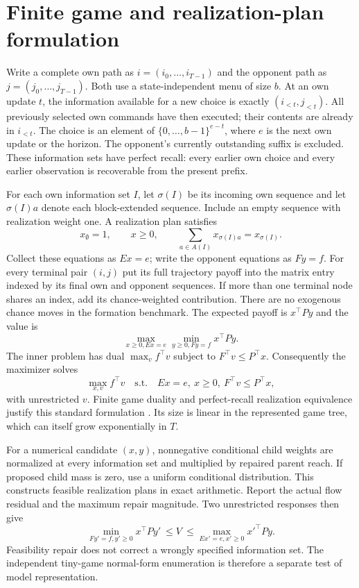 \section{Finite game and realization-plan formulation}
Write a complete own path as $i=(i_0,\ldots,i_{T-1})$ and the opponent path
as $j=(j_0,\ldots,j_{T-1})$. Both use a state-independent menu of size $b$.
At an own update $t$, the information available for a new choice is exactly
$(i_{<t},j_{<t})$. All previously selected own commands have then executed;
their contents are already in $i_{<t}$. The choice is an element of
$\{0,\ldots,b-1\}^{e-t}$, where $e$ is the next own update or the horizon.
The opponent's currently outstanding suffix is excluded. These information
sets have perfect recall: every earlier own choice and every earlier
observation is recoverable from the present prefix.

For each own information set $I$, let $\sigma(I)$ be its incoming own
sequence and let $\sigma(I)a$ denote each block-extended sequence. Include
an empty sequence with realization weight one. A realization plan satisfies
\[
 x_{\emptyset}=1,\qquad x\ge0,\qquad
 \sum_{a\in A(I)}x_{\sigma(I)a}=x_{\sigma(I)}.
\]
Collect these equations as $Ex=e$; write the opponent equations as $Fy=f$.
For every terminal pair $(i,j)$ put its full trajectory payoff into the
matrix entry indexed by its final own and opponent sequences. If more than
one terminal node shares an index, add its chance-weighted contribution.
There are no exogenous chance moves in the formation benchmark. The expected
payoff is $x^\top Py$ and the value is
\[
 \max_{x\ge0,Ex=e}\min_{y\ge0,Fy=f}x^\top Py.
\]
The inner problem has dual $\max_v f^\top v$ subject to $F^\top v\le P^\top x$.
Consequently the maximizer solves
\begin{equation}
 \max_{x,v}f^\top v\quad\text{s.t.}\quad
 Ex=e,\ x\ge0,\ F^\top v\le P^\top x,
 \label{eq:sf}
\end{equation}
with unrestricted $v$. Finite game duality and perfect-recall realization
equivalence justify this standard formulation \citep{stengel1996}.
Its size is linear in the represented game tree, which can itself grow
exponentially in $T$.

For a numerical candidate $(x,y)$, nonnegative conditional child weights
are normalized at every information set and multiplied by repaired parent
reach. If proposed child mass is zero, use a uniform conditional distribution.
This constructs feasible realization plans in exact arithmetic. Report the
actual flow residual and the maximum repair magnitude. Two unrestricted
responses then give
\[
 \min_{Fy'=f,y'\ge0}x^\top Py'\ \le V\ \le
 \max_{Ex'=e,x'\ge0}{x'}^\top Py.
\]
Feasibility repair does not correct a wrongly specified information set.
The independent tiny-game normal-form enumeration is therefore a separate
test of model representation.


